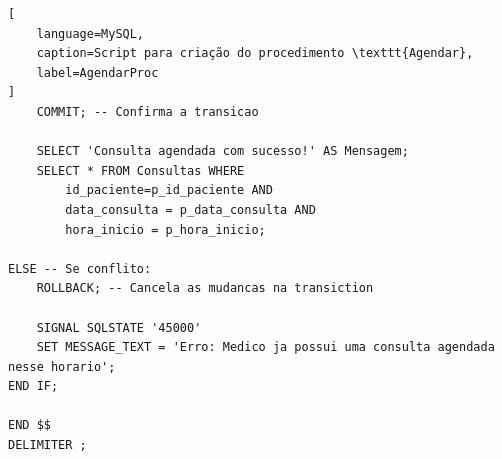 \begin{lstlisting}[
    language=MySQL,
    caption=Script para criação do procedimento \texttt{Agendar},
    label=AgendarProc
]
    COMMIT; -- Confirma a transicao
    
    SELECT 'Consulta agendada com sucesso!' AS Mensagem;
    SELECT * FROM Consultas WHERE 
        id_paciente=p_id_paciente AND 
        data_consulta = p_data_consulta AND 
        hora_inicio = p_hora_inicio;
    
ELSE -- Se conflito:
    ROLLBACK; -- Cancela as mudancas na transiction    
    
    SIGNAL SQLSTATE '45000'
    SET MESSAGE_TEXT = 'Erro: Medico ja possui uma consulta agendada nesse horario';
END IF;

END $$
DELIMITER ;
\end{lstlisting}